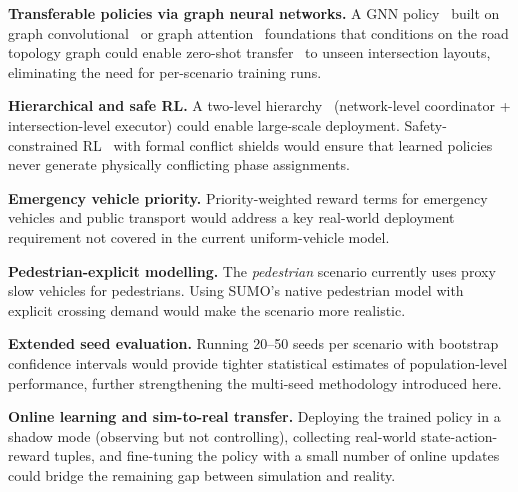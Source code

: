\documentclass[12pt,oneside,a4paper]{report}
\begin{document}
\textbf{Transferable policies via graph neural networks.}
A GNN policy~\cite{cctv2020} built on graph convolutional~\cite{gcn2017}
or graph attention~\cite{gat2018} foundations that conditions on the
road topology graph could enable zero-shot transfer~\cite{transferrl2009}
to unseen intersection layouts, eliminating the need for per-scenario
training runs.

\textbf{Hierarchical and safe RL.}
A two-level hierarchy~\cite{hierarchicalrl2021} (network-level coordinator
+ intersection-level executor) could enable large-scale deployment.
Safety-constrained RL~\cite{saferl2015} with formal conflict shields
would ensure that learned policies never generate physically conflicting
phase assignments.

\textbf{Emergency vehicle priority.}
Priority-weighted reward terms for emergency vehicles and public
transport would address a key real-world deployment requirement
not covered in the current uniform-vehicle model.

\textbf{Pedestrian-explicit modelling.}
The \textit{pedestrian} scenario currently uses proxy slow vehicles
for pedestrians.  Using SUMO's native pedestrian model with explicit
crossing demand would make the scenario more realistic.

\textbf{Extended seed evaluation.}
Running 20--50 seeds per scenario with bootstrap confidence intervals
would provide tighter statistical estimates of population-level
performance, further strengthening the multi-seed methodology
introduced here.

\textbf{Online learning and sim-to-real transfer.}
Deploying the trained policy in a shadow mode (observing but not
controlling), collecting real-world state-action-reward tuples,
and fine-tuning the policy with a small number of online updates
could bridge the remaining gap between simulation and reality.

\clearpage
{}



\end{document}
